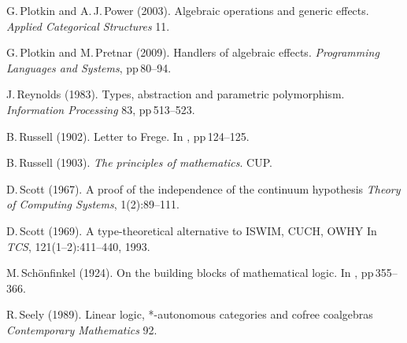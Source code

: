 \documentclass[11pt,twocolumn]{article}
\newcommand{\hide}[1]{}
\begin{document}
{\begin{thebibliography}{000}
G.\,Plotkin and A.\,J.\,Power (2003).
\newblock Algebraic operations and generic effects.
\newblock \emph{Applied Categorical Structures} 11.

G.\,Plotkin and M.\,Pretnar (2009).
\newblock Handlers of algebraic effects.
\newblock \emph{Programming Languages and Systems}, pp\,80--94.


J.\,Reynolds (1983).
\newblock Types, abstraction and parametric polymorphism.
\newblock \emph{Information Processing} 83, pp\,513--523.


B.\,Russell (1902).
\newblock Letter to Frege. 
\newblock In \emph{\cite{vanHeijenoort}}, pp\,124--125. 

B.\,Russell (1903).
\newblock \emph{The principles of mathematics}.
\newblock CUP.

D.\,Scott (1967).
\newblock A proof of the independence of the continuum hypothesis
\newblock \emph{Theory of Computing Systems}, 1(2):89--111.

D.\,Scott (1969).
\newblock A type-theoretical alternative to ISWIM, CUCH, OWHY
\newblock In \emph{TCS}, 121(1--2):411--440, 1993.

\hide{
\bibitem{ScottCV}
D.\,Scott (1970).
\newblock Constructive validity.
\newblock In LNM 125. 
}

M.\,Sch\"{o}nfinkel (1924).
\newblock On the building blocks of mathematical logic.
\newblock In \emph{\cite{vanHeijenoort}}, pp\,355--366.

R.\,Seely (1989).
\newblock Linear logic, *-autonomous categories and cofree coalgebras 
\newblock \emph{Contemporary Mathematics} 92. 

\hide{
\bibitem{Selinger}
P.\,Selinger (2011).
\newblock A survey of graphical languages for monoidal categories.
\newblock In LNP 813, pp\,289--355. 
}


\end{thebibliography}}
\end{document}
